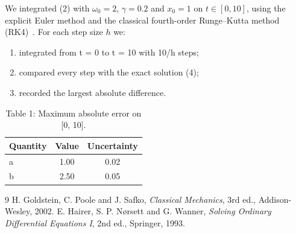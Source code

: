 \documentclass[11pt,a4paper]{article}
\begin{document}
We integrated (2) with $\omega_{0}=2$, $\gamma=0.2$ and $x_{0}=1$ on $t\in[0,10]$, using the explicit Euler method and the classical fourth-order Runge--Kutta method (RK4)~\cite{ref2}. For each step size $h$ we:
\begin{enumerate}
  \item integrated from t = 0 to t = 10 with 10/h steps;
  \item compared every step with the exact solution (4);
  \item recorded the largest absolute difference.
\end{enumerate}

\begin{table}[htbp]
  \centering
  \caption{Table 1: Maximum absolute error on [0, 10].}
  \label{tab:results}
  \begin{tabular}{lcc}
    \toprule
    \textbf{Quantity} & \textbf{Value} & \textbf{Uncertainty} \\
    \midrule
    a & 1.00 & 0.02 \\
    b & 2.50 & 0.05 \\
    \bottomrule
  \end{tabular}
\end{table}

\begin{thebibliography}{9}
 H. Goldstein, C. Poole and J. Safko, \emph{Classical Mechanics}, 3rd ed., Addison-Wesley, 2002.
 E. Hairer, S. P. Nørsett and G. Wanner, \emph{Solving Ordinary Differential Equations I}, 2nd ed., Springer, 1993.
\end{thebibliography}
\end{document}
